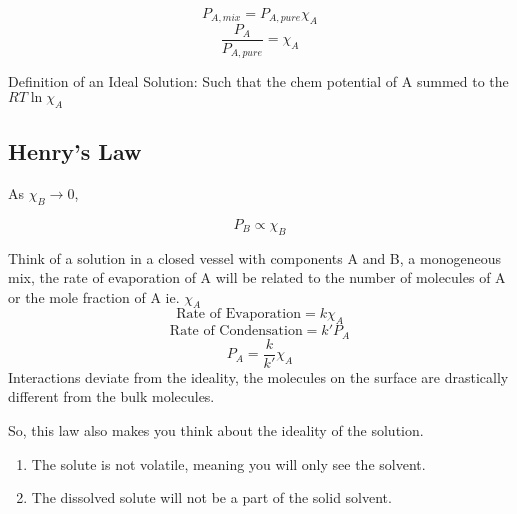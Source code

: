 \documentclass{article}
\theoremstyle{definition}
\begin{document}
\begin{center}
    

\end{center}
\[
P_{A, mix} = P_{A, pure}\chi_A
\]
\[
\frac{P_A}{P_{A, pure}} = \chi_A
\]


Definition of an Ideal Solution: Such that the chem potential of A summed to the $RT\ln{\chi_A}$

\subsection{Henry's Law}
As $\chi_B \rightarrow0$,

\[
P_B \propto \chi_B
\]

Think of a solution in a closed vessel with components A and B, a monogeneous mix, the rate of evaporation of A will be related to the number of molecules of A or the mole fraction of A  ie. $\chi_A$
\[
\text{Rate of Evaporation} = k\chi_A
\]
\[
\text{Rate of Condensation} = k'P_A
\]
\[
P_A = \frac{k}{k'}\chi_A
\]
Interactions deviate from the ideality, the molecules on the surface are drastically different from the bulk molecules.

So, this law also makes you think about the ideality of the solution.

\begin{enumerate}
    \item The solute is not volatile, meaning you will only see the solvent.
    \item The dissolved solute will not be a part of the solid solvent.
\end{enumerate}
\end{document}
